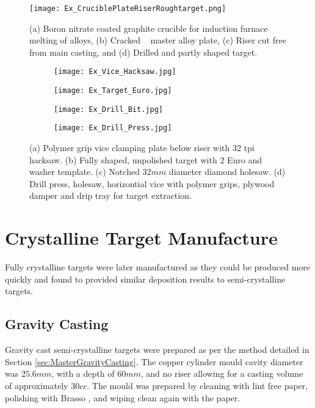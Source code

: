 \documentclass[a4paper,12pt,oneside]{report}%
\begin{document}
\begin{figure}[htbp]
	\centering
	\texttt{[image: Ex\_CruciblePlateRiserRoughtarget.png]}
	\caption{(a) Boron nitrate coated graphite crucible for induction furnace melting of alloys, (b) Cracked \MgZnCa~ master alloy plate, (c) Riser cut free from main casting, and (d) Drilled and partly shaped target.}
	\label{fig:CrucibleShaping}
\end{figure}

\begin{figure}[htbp]
	\centering
	\begin{subfigure}[htbp]{0.49\textwidth}
		\texttt{[image: Ex\_Vice\_Hacksaw.jpg]}
		\caption{}
		\label{fig:Vice}
	\end{subfigure}
	\begin{subfigure}[htbp]{0.38\textwidth}
		\texttt{[image: Ex\_Target\_Euro.jpg]}
		\caption{}
		\label{fig:TargetEuro}
	\end{subfigure}
	\begin{subfigure}[htbp]{0.275\textwidth}
		\texttt{[image: Ex\_Drill\_Bit.jpg]}
		\caption{}
		\label{fig:DrillBit}
	\end{subfigure}
	\begin{subfigure}[htbp]{0.30\textwidth}
		\texttt{[image: Ex\_Drill\_Press.jpg]}
		\caption{}
		\label{fig:DrillPress}
	\end{subfigure}
	\caption{(a) Polymer grip vice clamping plate below riser with 32 \acrshort{tpi} hacksaw. (b) Fully shaped, unpolished target with 2 Euro and washer template. (c) Notched $32 mm$ diameter diamond holesaw. (d) Drill press, holesaw, horizontial vice with polymer grips, plywood damper and drip tray for target extraction.}%
	\label{fig:ShapingEquipment}
\end{figure}

\section{Crystalline Target Manufacture}
Fully crystalline targets were later manufactured as they could be produced more quickly and found to provided similar deposition results to semi-crystalline targets.

\subsection{Gravity Casting}
Gravity cast semi-crystalline targets were prepared as per the method detailed in Section \ref{sec:MasterGravityCasting}. The copper cylinder mould cavity diameter was $25.6 mm$, with a depth of $60 mm$, and no riser allowing for a casting volume of approximately $30 cc$. The mould was prepared by cleaning with lint free paper, polishing with Brasso \textcopyright, and wiping clean again with the paper.
\end{document}
